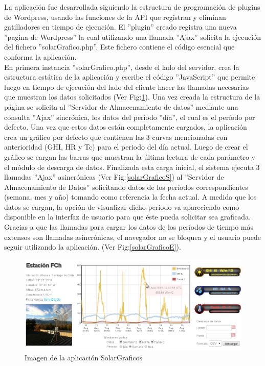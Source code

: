 La aplicación fue desarrollada siguiendo la estructura de programación de plugins de Wordpress\cite{aplicacion:wplugins}, usando las funciones de la API que registran y eliminan gatilladores en tiempo de ejecución. El ''plugin'' creado registra una nueva ''pagina de Wordpress'' la cual utilizando una llamada ''Ajax'' solicita la ejecución del fichero ''solarGrafico.php''. Este fichero contiene el código esencial que conforma la aplicación.\\

En primera instancia ''solarGrafico.php'', desde el lado del servidor, crea la estructura estática de la aplicación y escribe el código ''JavaScript'' que permite luego en tiempo de ejecución del lado del cliente hacer las llamadas necesarias que muestran los datos solicitados (Ver Fig:\ref{solarGraficoFoto1}). Una vez creada la estructura de la página se solicita al ''Servidor de Almacenamiento de datos'' mediante una consulta ''Ajax'' sincrónica, los datos del período ''día'', el cual es el período por defecto. Una vez que estos datos están completamente cargados, la aplicación crea un gráfico por defecto que contienen las 3 curvas mencionadas con anterioridad (GHI, HR y Tc) para el periodo del día actual. Luego de crear el gráfico se cargan las barras que muestran la última lectura de cada parámetro y el módulo de descarga de datos. Finalizada esta carga inicial, el sistema ejecuta 3 llamadas ''Ajax'' asincrónicas (Ver Fig:\ref{solarGraficoS}) al ''Servidor de Almacenamiento de Datos'' solicitando datos de los períodos correspondientes (semana, mes y año) tomando como referencia la fecha actual. A medida que los datos se cargan, la opción de visualizar dicho período va apareciendo como disponible en la interfaz de usuario para que éste pueda solicitar sea graficada. Gracias a que las llamadas para cargar los datos de los períodos de tiempo más extensos son llamadas asincrónicas, el navegador no se bloquea y el usuario puede seguir utilizando la aplicación. (Ver Fig:\ref{solarGraficoE}).

\begin{figure}[h!]
        \centering
        \includegraphics[scale=0.45]{images/solarGrafico}
        \caption{Imagen de la aplicación SolarGraficos}
        \label{solarGraficoFoto1}
\end{figure}

